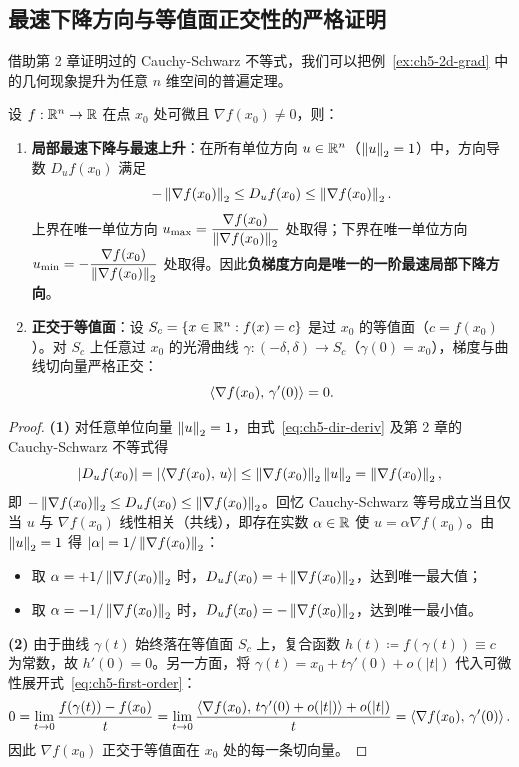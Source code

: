 \subsection{最速下降方向与等值面正交性的严格证明}

借助第 2 章证明过的 Cauchy-Schwarz 不等式，我们可以把例~\ref{ex:ch5-2d-grad} 中的几何现象提升为任意 $n$ 维空间的普遍定理。

\begin{thmBox}
\begin{theorem}[梯度的最速变化与正交性定理]\label{thm:ch5-steepest}
设 $f:\mathbb{R}^n\to\mathbb{R}$ 在点 $x_0$ 处可微且 $\nabla f(x_0)\neq 0$，则：
\begin{enumerate}
  \item \textbf{局部最速下降与最速上升}：在所有单位方向 $u\in\mathbb{R}^n$（$\left\|u\right\|_2=1$）中，方向导数 $D_u f(x_0)$ 满足
  \[
    -\left\|\nabla f(x_0)\right\|_2 \le D_u f(x_0) \le \left\|\nabla f(x_0)\right\|_2.
  \]
  上界在唯一单位方向 $u_{\max} = \dfrac{\nabla f(x_0)}{\left\|\nabla f(x_0)\right\|_2}$ 处取得；下界在唯一单位方向 $u_{\min} = -\dfrac{\nabla f(x_0)}{\left\|\nabla f(x_0)\right\|_2}$ 处取得。因此\textbf{负梯度方向是唯一的一阶最速局部下降方向}。
  \item \textbf{正交于等值面}：设 $S_c = \{x\in\mathbb{R}^n : f(x) = c\}$ 是过 $x_0$ 的等值面（$c = f(x_0)$）。对 $S_c$ 上任意过 $x_0$ 的光滑曲线 $\gamma:(-\delta,\delta)\to S_c$（$\gamma(0)=x_0$），梯度与曲线切向量严格正交：
  \[
    \left\langle \nabla f(x_0),\, \gamma'(0) \right\rangle = 0.
  \]
\end{enumerate}
\end{theorem}
\end{thmBox}

\begin{proof}
\textbf{(1)} 对任意单位向量 $\left\|u\right\|_2=1$，由式~\eqref{eq:ch5-dir-deriv} 及第 2 章的 Cauchy-Schwarz 不等式得
\[
  \left|D_u f(x_0)\right| = \left|\left\langle \nabla f(x_0),\, u \right\rangle\right| \le \left\|\nabla f(x_0)\right\|_2 \left\|u\right\|_2 = \left\|\nabla f(x_0)\right\|_2,
\]
即 $-\left\|\nabla f(x_0)\right\|_2 \le D_u f(x_0) \le \left\|\nabla f(x_0)\right\|_2$。回忆 Cauchy-Schwarz 等号成立当且仅当 $u$ 与 $\nabla f(x_0)$ 线性相关（共线），即存在实数 $\alpha\in\mathbb{R}$ 使 $u = \alpha \nabla f(x_0)$。由 $\left\|u\right\|_2 = 1$ 得 $|\alpha| = 1/\left\|\nabla f(x_0)\right\|_2$：
\begin{itemize}
  \item 取 $\alpha = +1/\left\|\nabla f(x_0)\right\|_2$ 时，$D_u f(x_0) = +\left\|\nabla f(x_0)\right\|_2$，达到唯一最大值；
  \item 取 $\alpha = -1/\left\|\nabla f(x_0)\right\|_2$ 时，$D_u f(x_0) = -\left\|\nabla f(x_0)\right\|_2$，达到唯一最小值。
\end{itemize}

\textbf{(2)} 由于曲线 $\gamma(t)$ 始终落在等值面 $S_c$ 上，复合函数 $h(t) \coloneqq f(\gamma(t)) \equiv c$ 为常数，故 $h'(0) = 0$。另一方面，将 $\gamma(t) = x_0 + t\gamma'(0) + o(|t|)$ 代入可微性展开式~\eqref{eq:ch5-first-order}：
\[
  0 = \lim_{t\to 0}\frac{f(\gamma(t)) - f(x_0)}{t}
    = \lim_{t\to 0}\frac{\left\langle \nabla f(x_0),\, t\gamma'(0) + o(|t|) \right\rangle + o(|t|)}{t}
    = \left\langle \nabla f(x_0),\, \gamma'(0) \right\rangle.
\]
因此 $\nabla f(x_0)$ 正交于等值面在 $x_0$ 处的每一条切向量。
\end{proof}

